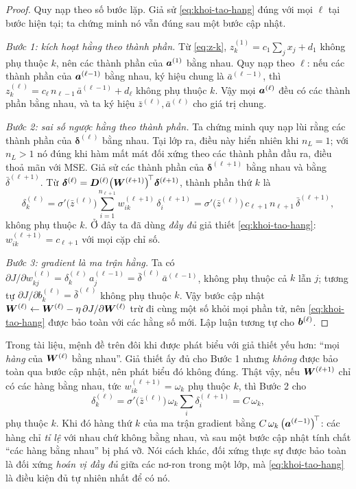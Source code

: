 \begin{proof}
Quy nạp theo số bước lặp. Giả sử \eqref{eq:khoi-tao-hang} đúng với mọi $\ell$
tại bước hiện tại; ta chứng minh nó vẫn đúng sau một bước cập nhật.
 
\emph{Bước 1: kích hoạt hằng theo thành phần.} Từ \eqref{eq:z-k},
$z^{(1)}_k = c_1\sum_j x_j + d_1$ không phụ thuộc $k$, nên các thành phần của
$\bm{a}^{(1)}$ bằng nhau. Quy nạp theo $\ell$: nếu các thành phần của
$\bm{a}^{(\ell-1)}$ bằng nhau, ký hiệu chung là $\bar a^{(\ell-1)}$, thì
$z^{(\ell)}_k = c_\ell\, n_{\ell-1}\, \bar a^{(\ell-1)} + d_\ell$ không phụ
thuộc $k$. Vậy mọi $\bm{a}^{(\ell)}$ đều có các thành phần bằng nhau, và ta ký hiệu
$\bar z^{(\ell)}, \bar a^{(\ell)}$ cho giá trị chung.
 
\emph{Bước 2: sai số ngược hằng theo thành phần.} Ta chứng minh quy nạp lùi rằng
các thành phần của $\bm{\delta}^{(\ell)}$ bằng nhau. Tại lớp ra, điều này hiển
nhiên khi $n_L = 1$; với $n_L > 1$ nó đúng khi hàm mất mát đối xứng theo các
thành phần đầu ra, điều thoả mãn với MSE. Giả sử các thành phần của
$\bm{\delta}^{(\ell+1)}$ bằng nhau và bằng $\bar\delta^{(\ell+1)}$. Từ
$\bm{\delta}^{(\ell)} = \bm{D}^{(\ell)}\big(\bm{W}^{(\ell+1)}\big)^{\!\top}
\bm{\delta}^{(\ell+1)}$, thành phần thứ $k$ là
\[
\delta^{(\ell)}_k
 = \sigma'\!\big(\bar z^{(\ell)}\big)
   \sum_{i=1}^{n_{\ell+1}} w^{(\ell+1)}_{ik}\,\delta^{(\ell+1)}_i
 = \sigma'\!\big(\bar z^{(\ell)}\big)\, c_{\ell+1}\, n_{\ell+1}\,
   \bar\delta^{(\ell+1)},
\]
không phụ thuộc $k$. Ở đây ta đã dùng \emph{đầy đủ} giả thiết
\eqref{eq:khoi-tao-hang}: $w^{(\ell+1)}_{ik} = c_{\ell+1}$ với mọi cặp chỉ số.
 
\emph{Bước 3: gradient là ma trận hằng.} Ta có
$\partial J/\partial w^{(\ell)}_{kj} = \delta^{(\ell)}_k\, a^{(\ell-1)}_j
 = \bar\delta^{(\ell)}\,\bar a^{(\ell-1)}$, không phụ thuộc cả $k$ lẫn $j$;
tương tự $\partial J/\partial b^{(\ell)}_k = \bar\delta^{(\ell)}$ không phụ
thuộc $k$. Vậy bước cập nhật
$\bm{W}^{(\ell)} \gets \bm{W}^{(\ell)} - \eta\,\partial J/\partial\bm{W}^{(\ell)}$ trừ đi
cùng một số khỏi mọi phần tử, nên \eqref{eq:khoi-tao-hang} được bảo toàn với các
hằng số mới. Lập luận tương tự cho $\bm{b}^{(\ell)}$.
\end{proof}
 
\begin{nhanxet}
\label{nx:phan-vi-du}
Trong tài liệu, mệnh đề trên đôi khi được phát biểu với giả thiết yếu hơn: ``mọi
\emph{hàng} của $\bm{W}^{(\ell)}$ bằng nhau''. Giả thiết ấy đủ cho Bước 1 nhưng
\emph{không} được bảo toàn qua bước cập nhật, nên phát biểu đó không đúng. Thật
vậy, nếu $\bm{W}^{(\ell+1)}$ chỉ có các hàng bằng nhau, tức
$w^{(\ell+1)}_{ik} = \omega_k$ phụ thuộc $k$, thì Bước 2 cho
\[
\delta^{(\ell)}_k
 = \sigma'\!\big(\bar z^{(\ell)}\big)\,\omega_k
   \sum_{i} \delta^{(\ell+1)}_i
 = C\,\omega_k ,
\]
phụ thuộc $k$. Khi đó hàng thứ $k$ của ma trận gradient bằng
$C\,\omega_k\,\big(\bm{a}^{(\ell-1)}\big)^{\!\top}$: các hàng chỉ \emph{tỉ lệ} với
nhau chứ không bằng nhau, và sau một bước cập nhật tính chất ``các hàng bằng
nhau'' bị phá vỡ. Nói cách khác, đối xứng thực sự được bảo toàn là đối xứng
\emph{hoán vị đầy đủ} giữa các nơ-ron trong một lớp, mà \eqref{eq:khoi-tao-hang}
là điều kiện đủ tự nhiên nhất để có nó.
\end{nhanxet}
 

